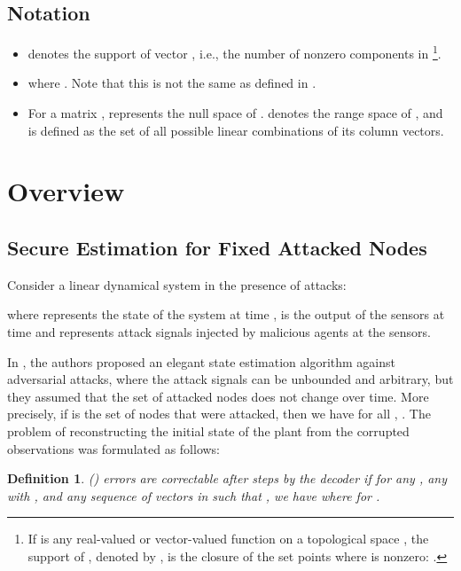 \documentclass[journal]{IEEEtran}
\newtheorem{Def}{\bf{Definition}}
\begin{document}
\subsection{Notation}
\begin{itemize}
\item 
  denotes the support of vector , i.e., the number of nonzero components in \footnote{If  is any real-valued or vector-valued function on a topological space , the support of , denoted by , is the closure of the set points where  is nonzero: .}. 
\item 
 where . Note that this is not the same as  defined in \cite{Fawzi2014}. 
\item  
For a matrix ,  represents the null space of .  denotes the range space of , and is defined as the set of all possible linear combinations of its column vectors.
\end{itemize}









\section{Overview}\label{sec:overview}
\subsection{Secure Estimation for Fixed Attacked Nodes \cite{Fawzi2014} }Consider a linear dynamical system in the presence of attacks:

where  represents the state of the system at time ,  is the output of the sensors at time  and  represents attack signals injected by malicious agents at the sensors. 

In \cite{Fawzi2014}, the authors proposed an elegant state estimation algorithm against adversarial attacks, where the attack signals can be unbounded and arbitrary, but they assumed that the set of attacked nodes  does not change over time. More precisely, if  is the set of nodes that were attacked, then we have for all , . The problem of reconstructing the initial state  of the plant from the corrupted observations  was formulated as follows:

\begin{Def} \emph{(\hspace{1sp}\cite{Fawzi2014})}  errors are correctable after  steps by the decoder  if for any , any  with , and any sequence of vectors  in  such that , we have  where  for .
\end{Def}
\end{document}
